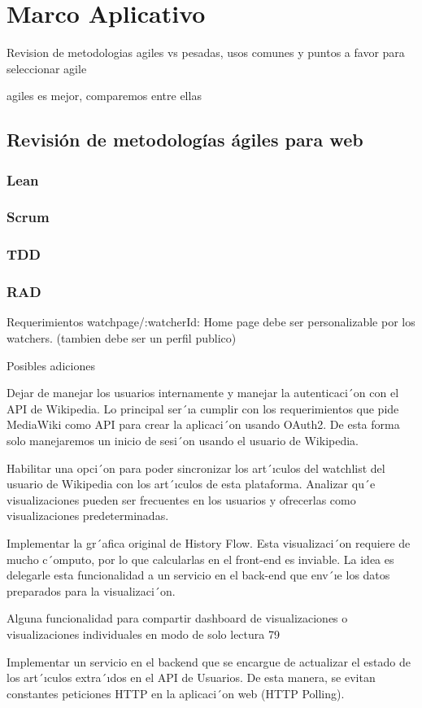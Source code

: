 \section{Marco Aplicativo}

Revision de metodologias agiles vs pesadas, usos comunes y puntos a favor para seleccionar agile

agiles es mejor, comparemos entre ellas
\cite{ComparacionFrameworks}
\subsection{Revisión de metodologías ágiles para web }

\subsubsection{Lean}
\subsubsection{Scrum}
\subsubsection{TDD}
\subsubsection{RAD}

Requerimientos
watchpage/:watcherId: Home page debe ser personalizable por los watchers. (tambien debe ser un perfil publico)


Posibles adiciones

\begin{list}{}{}
    \item Dejar de manejar los usuarios internamente y manejar la autenticaci´on
          con el API de Wikipedia. Lo principal ser´ıa cumplir con los requerimientos que pide MediaWiki como API para crear la aplicaci´on usando
          OAuth2. De esta forma solo manejaremos un inicio de sesi´on usando el
          usuario de Wikipedia.
    \item Habilitar una opci´on para poder sincronizar los art´ıculos del watchlist
          del usuario de Wikipedia con los art´ıculos de esta plataforma.
          Analizar qu´e visualizaciones pueden ser frecuentes en los usuarios y
          ofrecerlas como visualizaciones predeterminadas.
    \item Implementar la gr´afica original de History Flow. Esta visualizaci´on requiere de mucho c´omputo, por lo que calcularlas en el front-end es
          inviable. La idea es delegarle esta funcionalidad a un servicio en el
          back-end que env´ıe los datos preparados para la visualizaci´on.
    \item Alguna funcionalidad para compartir dashboard de visualizaciones o
          visualizaciones individuales en modo de solo lectura
          79
    \item Implementar un servicio en el backend que se encargue de actualizar
          el estado de los art´ıculos extra´ıdos en el API de Usuarios. De esta
          manera, se evitan constantes peticiones HTTP en la aplicaci´on web
          (HTTP Polling).
\end{list}
